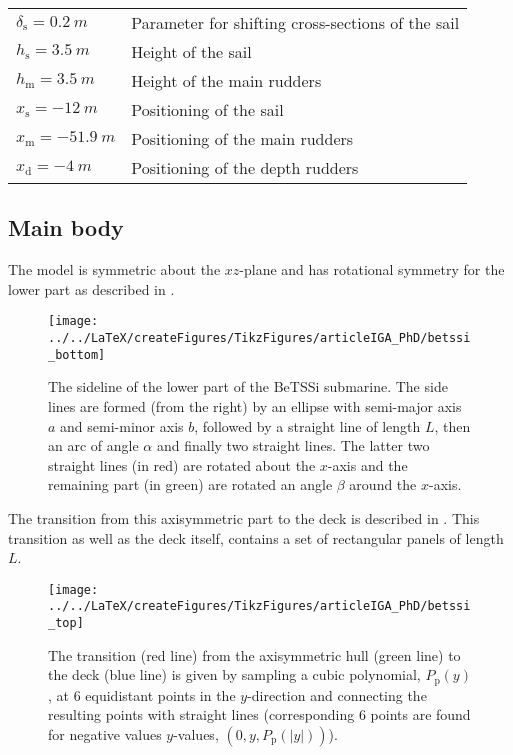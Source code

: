 \begin{table}
\begin{tabular}{l l}
		$\delta_{\mathrm{s}}=\SI{0.2}{m}$ & Parameter for shifting cross-sections of the sail\\
		$h_{\mathrm{s}}=\SI{3.5}{m}$ & Height of the sail\\
		$h_{\mathrm{m}}=\SI{3.5}{m}$ & Height of the main rudders\\
		$x_{\mathrm{s}}=-\SI{12}{m}$ & Positioning of the sail\\
		$x_{\mathrm{m}}=-\SI{51.9}{m}$ & Positioning of the main rudders\\
		$x_{\mathrm{d}}=-\SI{4}{m}$ & Positioning of the depth rudders\\
		\bottomrule
	\end{tabular}
\end{table}

\subsection{Main body}
The model is symmetric about the $xz$-plane and has rotational symmetry for the lower part as described in .
\begin{figure}
	\centering
	\texttt{[image: ../../LaTeX/createFigures/TikzFigures/articleIGA\_PhD/betssi\_bottom]}
	\caption{The sideline of the lower part of the BeTSSi submarine. The side lines are formed (from the right) by an ellipse with semi-major axis $a$ and semi-minor axis $b$, followed by a straight line of length $L$, then an arc of angle $\alpha$ and finally two straight lines. The latter two straight lines (in red) are rotated about the $x$-axis and the remaining part (in green) are rotated an angle $\beta$ around the $x$-axis.}
	\label{Fig3:bettsi_bottom}
\end{figure}
The transition from this axisymmetric part to the deck is described in . This transition as well as the deck itself, contains a set of rectangular panels of length $L$.
\begin{figure}
	\centering
	\texttt{[image: ../../LaTeX/createFigures/TikzFigures/articleIGA\_PhD/betssi\_top]}
	\caption{The transition (red line) from the axisymmetric hull (green line) to the deck (blue line) is given by sampling a cubic polynomial, $P_{\mathrm{p}}(y)$, at 6 equidistant points in the $y$-direction and connecting the resulting points with straight lines (corresponding 6 points are found for negative values $y$-values, $(0,y,P_{\mathrm{p}}(|y|))$).}
	\label{Fig3:bettsi_top}
\end{figure}
